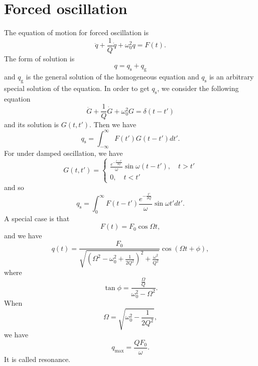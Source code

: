 \section{Forced oscillation}
The equation of motion for forced oscillation is
\[\ddot{q} + \frac{1}{Q}\dot{q} + \omega_0^2 q = F(t).\]
The form of solution is
\[q = q_{\mathrm{s}} + q_{\mathrm{g}} \]
and $q_{\mathrm{g}}$ is the general solution of the homogeneous equation and $q_{\mathrm{s}}$ is an arbitrary special solution of the equation. In order to get $q_{\mathrm{s}}$, we consider the following equation
\[\ddot{G} + \frac{1}{Q}\dot{G} + \omega_0^2 G = \delta(t-t') \]
and its solution is $G(t,t')$.
Then we have
\[q_{\mathrm{s}} = \int_{-\infty}^{\infty} F(t')G(t-t')dt'.\]
For under damped oscillation, we have
\[G(t,t') = \begin{cases} \frac{e^{-\frac{t-t'}{2Q}}}{\omega} \sin\omega(t-t') ,\quad t>t'\\ 0 ,\quad t<t'\end{cases} \]
and so
\[q_{\mathrm{s}} = \int_{0}^{\infty} F(t-t') \frac{e^{-\frac{t'}{2Q}}}{\omega} \sin\omega t' dt'.\]
A special case is that
\[F(t) = F_0 \cos\Omega t ,\]
and we have
\[q(t) = \frac{F_0}{\sqrt{(\Omega^2 - \omega_0^2 + \frac{1}{2Q^2})^2 + \frac{\omega^2}{Q^2}}} \cos(\Omega t + \phi), \]
where
\[\tan \phi = \frac{\frac{\Omega}{Q}}{\omega_0^2 - \Omega^2}.\]
When
\[\Omega = \sqrt{\omega_0^2 - \frac{1}{2Q^2}},\]
we have
\[q_{\mathrm{max}} = \frac{QF_0}{\omega}.\]
It is called resonance. 

